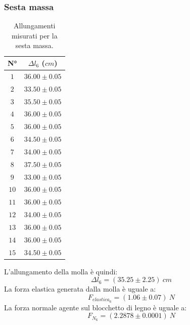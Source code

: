 \documentclass[11pt]{article}
\begin{document}
\subsubsection{Sesta massa}
\begin{table}[H]
\centering
\begin{tabular}{|c|c|}
\hline
\textbf{N°} & \textbf{$\Delta l_6$ ($cm$)}\\
\hline
$1$ & $36.00\pm 0.05$ \\
\hline
$2$ & $33.50\pm 0.05$ \\
\hline
$3$ & $35.50\pm 0.05$ \\
\hline
$4$ & $36.00\pm 0.05$ \\
\hline
$5$ & $36.00\pm 0.05$ \\
\hline
$6$ & $34.50\pm 0.05$ \\
\hline
$7$ & $34.00\pm 0.05$ \\
\hline
$8$ & $37.50\pm 0.05$ \\
\hline
$9$ & $33.00\pm 0.05$ \\
\hline
$10$ & $36.00\pm 0.05$ \\
\hline
$11$ & $36.00\pm 0.05$ \\
\hline
$12$ & $34.00\pm 0.05$ \\
\hline
$13$ & $36.00\pm 0.05$ \\
\hline
$14$ & $36.00\pm 0.05$ \\
\hline
$15$ & $34.50\pm 0.05$ \\
\hline
\end{tabular}
\caption{Allungamenti misurati per la sesta massa.}
\label{tab:}
\end{table}
L'allungamento della molla è quindi:
\begin{equation}
    \Delta l_6=(35.25\pm 2.25)\ cm
\end{equation}
La forza elastica generata dalla molla è uguale a:
\begin{equation}
    F_{elastica_6} = (1.06\pm 0.07)\ N
\end{equation}
La forza normale agente sul blocchetto di legno è uguale a:
\begin{equation}
    F_{N_6} = (2.2878\pm 0.0001)\ N
\end{equation}
\end{document}

